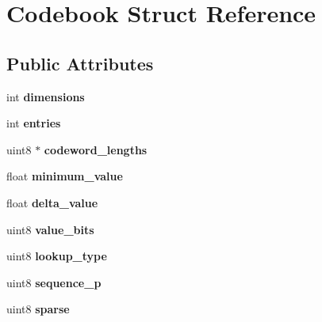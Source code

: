 \hypertarget{structCodebook}{\section{Codebook Struct Reference}
\label{structCodebook}
}
\subsection*{Public Attributes}
\begin{DoxyCompactItemize}
\item 
\hypertarget{structCodebook_af2c97899a7fc32b58c0e05d2c357fbd4}{int {\bfseries dimensions}}\label{structCodebook_af2c97899a7fc32b58c0e05d2c357fbd4}

\item 
\hypertarget{structCodebook_a3b75d1bd874ad98d552c15c547d5fc6a}{int {\bfseries entries}}\label{structCodebook_a3b75d1bd874ad98d552c15c547d5fc6a}

\item 
\hypertarget{structCodebook_a5f692a0d4af17c8ea3b085a21b8e3ef9}{uint8 $\ast$ {\bfseries codeword\-\_\-lengths}}\label{structCodebook_a5f692a0d4af17c8ea3b085a21b8e3ef9}

\item 
\hypertarget{structCodebook_a045762c79343b6153ec1978136f1feaa}{float {\bfseries minimum\-\_\-value}}\label{structCodebook_a045762c79343b6153ec1978136f1feaa}

\item 
\hypertarget{structCodebook_a5f68e4a9acd173f69425233d995c37ed}{float {\bfseries delta\-\_\-value}}\label{structCodebook_a5f68e4a9acd173f69425233d995c37ed}

\item 
\hypertarget{structCodebook_a229d0699f42bd26a99b37845aaab75eb}{uint8 {\bfseries value\-\_\-bits}}\label{structCodebook_a229d0699f42bd26a99b37845aaab75eb}

\item 
\hypertarget{structCodebook_addaf4509eb971e141389d6fefe3509c4}{uint8 {\bfseries lookup\-\_\-type}}\label{structCodebook_addaf4509eb971e141389d6fefe3509c4}

\item 
\hypertarget{structCodebook_a44cedf17428b52f1df2f62a46c3af880}{uint8 {\bfseries sequence\-\_\-p}}\label{structCodebook_a44cedf17428b52f1df2f62a46c3af880}

\item 
\hypertarget{structCodebook_ab777487c6199ae81d2384f6acc113cf2}{uint8 {\bfseries sparse}}\label{structCodebook_ab777487c6199ae81d2384f6acc113cf2}


\end{DoxyCompactItemize}
